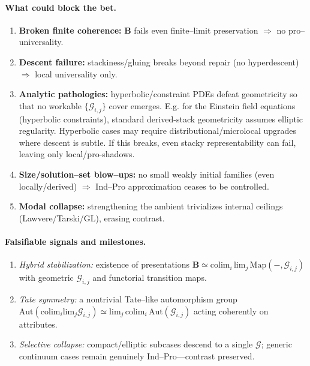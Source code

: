 \documentclass[11pt]{article}
\theoremstyle{upright}
\begin{document}
\paragraph{What could block the bet.}
\begin{enumerate}[leftmargin=2em,label=(F\arabic*)]
\item \textbf{Broken finite coherence:} $\mathbf B$ fails even finite–limit preservation $\Rightarrow$ no pro–universality.
\item \textbf{Descent failure:} stackiness/gluing breaks beyond repair (no hyperdescent) $\Rightarrow$ local universality only.
\item \textbf{Analytic pathologies:} hyperbolic/constraint PDEs defeat geometricity so that no workable $\{\mathcal G_{i,j}\}$ cover emerges. E.g. for the Einstein field equations (hyperbolic constraints), standard derived-stack geometricity assumes elliptic regularity. Hyperbolic cases may require distributional/microlocal upgrades where descent is subtle. If this breaks, even stacky representability can fail, leaving only local/pro-shadows.
\item \textbf{Size/solution–set blow–ups:} no small weakly initial families (even locally/derived) $\Rightarrow$ Ind–Pro approximation ceases to be controlled.
\item \textbf{Modal collapse:} strengthening the ambient trivializes internal ceilings (Lawvere/Tarski/GL), erasing contrast.
\end{enumerate}

\paragraph{Falsifiable signals and milestones.}
\begin{enumerate}[leftmargin=2em,label=(S\arabic*)]
\item \emph{Hybrid stabilization:} existence of presentations $\mathbf B \simeq \mathrm{colim}_i\,\mathrm{lim}_j\,\mathrm{Map}(-,\mathcal G_{i,j})$ with geometric $\mathcal G_{i,j}$ and functorial transition maps.
\item \emph{Tate symmetry:} a nontrivial Tate–like automorphism group $\displaystyle \mathrm{Aut}\!\left(\mathrm{colim}_i\mathrm{lim}_j\mathcal G_{i,j}\right)\simeq \mathrm{lim}_j\,\mathrm{colim}_i\,\mathrm{Aut}(\mathcal G_{i,j})$ acting coherently on attributes.
\item \emph{Selective collapse:} compact/elliptic subcases descend to a single $\mathcal G$; generic continuum cases remain genuinely Ind–Pro—contrast preserved.
\end{enumerate}
\end{document}
